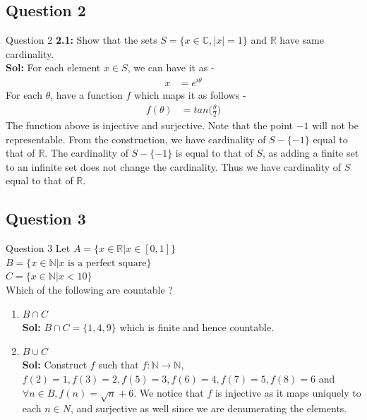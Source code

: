 \documentclass[xcolor=svgnames]{beamer}
\begin{document}
\subsection{Question 2}
\begin{frame}{Question 2}
\textbf{2.1:} Show that the sets $S = \{x \in \mathbb{C},  |x| = 1 \}$ and $\mathbb{R}$ have same cardinality.
\\ \textbf{Sol:} For each element $ x \in S$, we can have it as - 
\begin{align*}
    x &= e ^{i \theta}
\end{align*}
For each $\theta$, have a function $f$ which maps it as follows - 
\begin{align*}
    f(\theta) &= tan\bigg(\frac{\theta}{2}\bigg)
\end{align*}
The function above is injective and surjective. Note that the point $-1$ will not be representable. From the construction, we have cardinality of $S - \{-1\}$ equal to that of $\mathbb{R}$. The cardinality of $S - \{-1\}$ is equal to that of $S$, as adding a finite set to an infinite set does not change the cardinality. Thus we have cardinality of $S$ equal to that of $\mathbb{R}$. 
\end{frame}

\subsection{Question 3}

\begin{frame}{Question 3}
Let $A = \{x \in \mathbb{R}| x \in [0,1] \}$
\\ $B = \{x \in \mathbb{N} | x \text{ is a perfect square}\}$
\\ $C = \{x \in \mathbb{N} | x < 10\}$
\\ Which of the following are countable ?
\begin{enumerate}
    \item $B \cap C$
    \\ \textbf{Sol:} $B \cap C = \{1,4,9\}$ which is finite and hence countable. 
    \item $B \cup C$
    \\ \textbf{Sol:} Construct $f$ such that $f: \mathbb{N} \rightarrow \mathbb{N}$, $f(2) = 1, f(3) = 2, f(5) = 3, f(6) = 4, f(7) = 5, f(8) = 6$ and $\forall n \in B, f(n) = \sqrt{n} + 6 $. We notice that $f$ is injective as it maps uniquely to each $n \in N$, and surjective as well since we are denumerating the elements.
\end{enumerate}
\end{frame}
\end{document}
